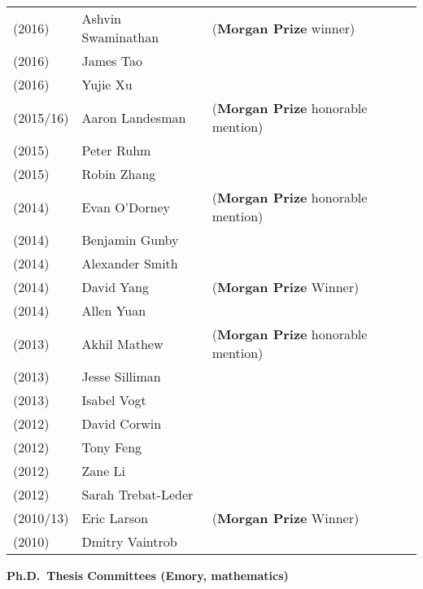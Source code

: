 \documentclass[margin,line]{res}
\begin{document}
\begin{resume}
\begin{tabular}{lll}
(2016) & Ashvin Swaminathan & (\textbf{Morgan Prize} winner)  \\
(2016) & James Tao & \\
(2016) & Yujie Xu & \\

(2015/16) & Aaron Landesman & (\textbf{Morgan Prize} honorable mention)      \\
(2015) & Peter Ruhm & \\
(2015) & Robin Zhang & \\

(2014) & Evan O'Dorney    & (\textbf{Morgan Prize} honorable mention) \\
(2014) & Benjamin Gunby & \\
(2014) & Alexander Smith & \\
(2014) & David Yang & (\textbf{Morgan Prize} Winner)  \\
(2014) & Allen Yuan & \\

(2013) & Akhil Mathew  & (\textbf{Morgan Prize} honorable mention)  \\
(2013) & Jesse Silliman & \\
(2013) & Isabel Vogt & \\

(2012) & David Corwin & \\
(2012) & Tony Feng & \\
(2012) & Zane Li & \\
(2012) & Sarah Trebat-Leder & \\

(2010/13) & Eric Larson  & (\textbf{Morgan Prize} Winner) \\
(2010) & Dmitry Vaintrob & \\
\end{tabular}




{\bf Ph.D.~Thesis Committees (Emory, mathematics)}
\vspace*{-.15in}


\end{resume}
\end{document}
